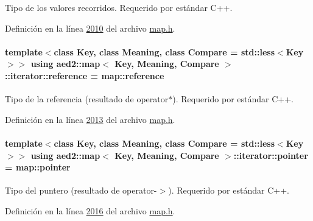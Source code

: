 Tipo de los valores recorridos. Requerido por estándar C++. 



Definición en la línea \hyperlink{map_8h_source_l02010}{2010} del archivo \hyperlink{map_8h_source}{map.\+h}.

\paragraph[{\texorpdfstring{reference}{reference}}]{\setlength{\rightskip}{0pt plus 5cm}template$<$class Key, class Meaning, class Compare = std\+::less$<$\+Key$>$$>$ using {\bf aed2\+::map}$<$ Key, Meaning, Compare $>$\+::{\bf iterator\+::reference} =  {\bf map\+::reference}}\hypertarget{classaed2_1_1map_1_1iterator_ac19788914a3110897e44c53f1318f6af_ac19788914a3110897e44c53f1318f6af}{}\label{classaed2_1_1map_1_1iterator_ac19788914a3110897e44c53f1318f6af_ac19788914a3110897e44c53f1318f6af}


Tipo de la referencia (resultado de operator$\ast$). Requerido por estándar C++. 



Definición en la línea \hyperlink{map_8h_source_l02013}{2013} del archivo \hyperlink{map_8h_source}{map.\+h}.

\paragraph[{\texorpdfstring{pointer}{pointer}}]{\setlength{\rightskip}{0pt plus 5cm}template$<$class Key, class Meaning, class Compare = std\+::less$<$\+Key$>$$>$ using {\bf aed2\+::map}$<$ Key, Meaning, Compare $>$\+::{\bf iterator\+::pointer} =  {\bf map\+::pointer}}\hypertarget{classaed2_1_1map_1_1iterator_a52ea7bdbf1dc6b252aec76633564bdf5_a52ea7bdbf1dc6b252aec76633564bdf5}{}\label{classaed2_1_1map_1_1iterator_a52ea7bdbf1dc6b252aec76633564bdf5_a52ea7bdbf1dc6b252aec76633564bdf5}


Tipo del puntero (resultado de operator-\/$>$). Requerido por estándar C++. 



Definición en la línea \hyperlink{map_8h_source_l02016}{2016} del archivo \hyperlink{map_8h_source}{map.\+h}.

